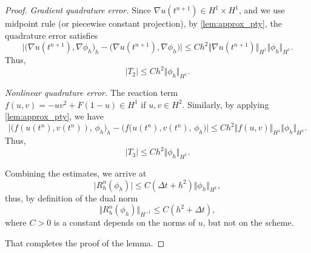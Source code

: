 \documentclass[10pt,a4paper]{amsart}
\begin{document}
\begin{proof}
		\textit{Gradient quadrature error.} Since $\nabla u(t^{n+1})\in H^1\times H^1$, and  we use midpoint rule (or piecewise constant projection), by \cref{lem:approx_pty}, the quadrature error satisfies
		\begin{equation*}
			\big\vert   \big( \nabla u(t^{n+1}), \nabla \phi_h \big)_h-   \big( \nabla u(t^{n+1}), \nabla \phi_h \big)\big\vert \leq C h^2\Vert \nabla u(t^{n+1})\Vert_{H^{1}}\Vert \phi_h\Vert_{H^1}.
		\end{equation*}
		Thus, 
		\begin{equation*}
			\vert T_2\vert\leq Ch^2\Vert \phi_h\Vert_{H^{1}}.
		\end{equation*}
		
		\textit{Nonlinear quadrature error.} The reaction term $f(u,v) = -uv^2 + F(1-u)\in H^1$ if $u,v\in H^2$. Similarly, by applying \cref{lem:approx_pty}, we have
		\begin{equation*}
			\big\vert  \big(f(u(t^n),v(t^n)), \, \phi_h \big)_h - \big(f(u(t^n),v(t^n), \, \phi_h\big)\big\vert \leq Ch^2\Vert f(u,v)\Vert_{H^1}\Vert \phi_h\Vert_{H^{1}}.
		\end{equation*}
		Thus, 
		\begin{equation*}
			\vert T_3\vert \leq Ch^2\Vert \phi_h\Vert_{H^{1}}.
		\end{equation*}
		
		Combining the estimates, we arrive at
		\begin{equation*}
			\vert R_h^n(\phi_h)\vert \leq C(\Delta t + h^2)\Vert \phi_h\Vert_{H^{1}},
		\end{equation*}
		thus, by definition of the dual norm
		\begin{equation*}
			\Vert R_h^n(\phi_h)\Vert_{H^{-1}}\leq C(h^2 + \Delta t),
		\end{equation*}
		where $C>0$ is a constant depends on the norms of $u$, but not on the scheme.
		
		That completes the proof of the lemma.
	\end{proof}
\end{document}
